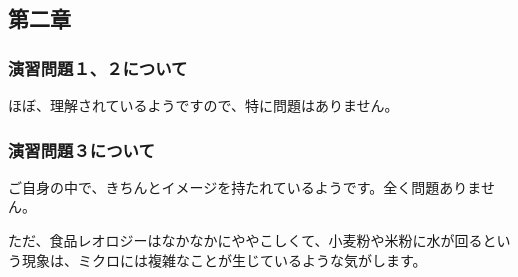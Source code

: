 \documentclass[uplatex,dvipdfmx,a4paper,11pt]{jsreport}
\begin{document}
\subsection*{第二章}
\subsubsection*{演習問題１、２について}
ほぼ、理解されているようですので、特に問題はありません。


\subsubsection*{演習問題３について}

ご自身の中で、きちんとイメージを持たれているようです。全く問題ありません。

ただ、食品レオロジーはなかなかにややこしくて、小麦粉や米粉に水が回るという現象は、ミクロには複雑なことが生じているような気がします。


\clearpage
\end{document}
